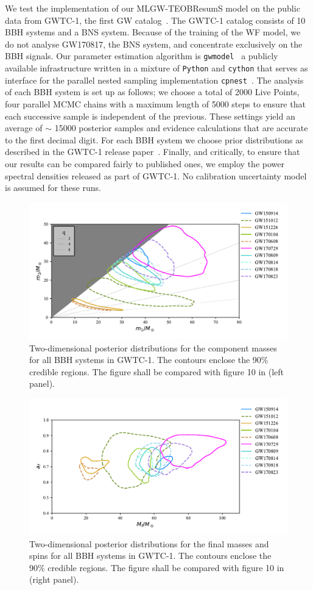 We test the implementation of our MLGW-TEOBResumS model on the public data from GWTC-1, the first GW catalog~\cite{}. 
The GWTC-1 catalog consists of 10 BBH systems and a BNS system. Because of the training of the WF model, we do not analyse GW170817, the BNS system, and concentrate exclusively on the BBH signals. Our parameter estimation algorithm is \texttt{gwmodel}~\cite{} a publicly available infrastructure 
written in a mixture of \texttt{Python} and \texttt{cython} that serves as interface for the parallel nested sampling implementation \texttt{cpnest}~\cite{}. 
The analysis of each BBH system is set up as follows; we choose a total of 2000 Live Points, four parallel MCMC chains with a maximum length of 5000 steps to ensure that each successive sample is independent of the previous. These settings yield an average of $\sim$ 15000 posterior samples and 
evidence calculations that are accurate to the first decimal digit. For each BBH system we choose prior distributions as described in the GWTC-1 release paper~\cite{}. Finally, and critically, to ensure that our results can be compared fairly to published ones, we employ the power spectral densities released as part of GWTC-1. No calibration uncertainty model is assumed for these runs. 
\begin{figure}[]
	\centering
    \includegraphics[width=.75\linewidth]{img/posterior_masses_source.pdf}
	\caption{
Two-dimensional posterior distributions for the component masses for all BBH systems in GWTC-1. The contours enclose the 90\% credible regions.
The figure shall be compared with figure 10 in \cite{Abbott_2019_GWTC} (left panel).
}
	\label{fig:summary-masses}
\end{figure}

\begin{figure}[]
	\centering
    \includegraphics[width=.75\linewidth]{img/final_spin_mass.pdf}
	\caption{
Two-dimensional posterior distributions for the final masses and spins for all BBH systems in GWTC-1. The contours enclose the 90\% credible regions.
The figure shall be compared with figure 10 in \cite{Abbott_2019_GWTC} (right panel).
}
	\label{fig:summary-final-state}
\end{figure}


